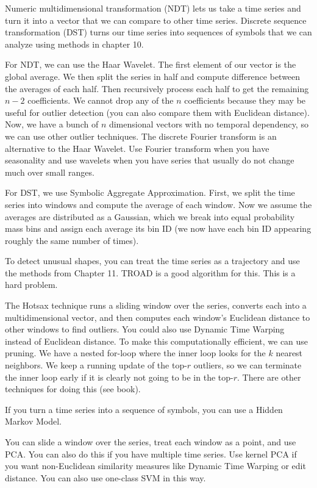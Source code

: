 \documentclass[a4paper]{article}
\begin{document}
Numeric multidimensional transformation (NDT) lets us take a time series and turn
it into a vector that we can compare to other time series. Discrete sequence
transformation (DST) turns our time series into sequences of symbols that we can
analyze using methods in chapter 10.

For NDT, we can use the Haar Wavelet. The first element of our vector is
the global average. We then split the series in half and compute difference
between the averages of each half. Then recursively process each half to get
the remaining $n - 2$ coefficients. We cannot drop any of the $n$ coefficients
because they may be useful for outlier detection (you can also
compare them with Euclidean distance). Now, we have a bunch of
$n$ dimensional vectors with no temporal dependency, so we can use other
outlier techniques. The discrete Fourier transform is an alternative to the
Haar Wavelet. Use Fourier transform when you have seasonality and use wavelets
when you have series that usually do not change much over small ranges.

For DST, we use Symbolic Aggregate Approximation. First, we split the time
series into windows and compute the average of each window. Now we assume
the averages are distributed as a Gaussian, which we break into equal probability
mass bins and assign each average its bin ID (we now have each bin ID appearing
roughly the same number of times).

To detect unusual shapes, you can treat the time series as a trajectory and use
the methods from Chapter 11. TROAD is a good algorithm for this. This is a
hard problem.

The Hotsax technique runs a sliding window over the series, converts each
into a multidimensional vector, and then computes each window's Euclidean
distance to other windows to find outliers. You could also use Dynamic Time
Warping instead of Euclidean distance. To make this computationally efficient,
we can use pruning. We have a nested for-loop where the inner loop looks for
the $k$ nearest neighbors. We keep a running update of the top-$r$ outliers,
so we can terminate the inner loop early if it is clearly not going to be in
the top-$r$. There are other techniques for doing this (see book).

If you turn a time series into a sequence of symbols, you can use a Hidden
Markov Model.

You can slide a window over the series, treat each window as a point, and use
PCA. You can also do this if you have multiple time series. Use kernel PCA
if you want non-Euclidean similarity measures like Dynamic Time Warping or
edit distance. You can also use one-class SVM in this way.
\end{document}
